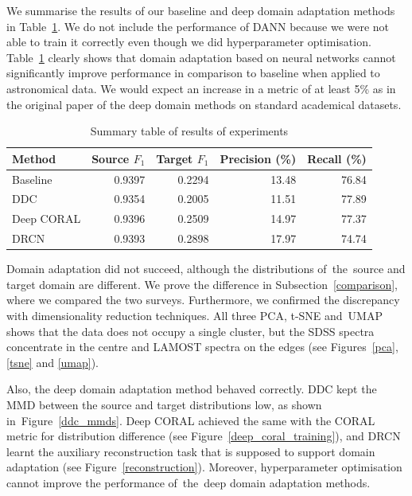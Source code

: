 We summarise the results of our baseline and deep domain adaptation methods in Table~\ref{summary}.
We do not include the performance of DANN
because we were not able to train it correctly even though we did hyperparameter optimisation.
Table~\ref{summary} clearly shows that domain adaptation based on neural networks cannot significantly improve performance in comparison to baseline
when applied to astronomical data.
We would expect an increase in a metric of at least 5\% as in the original paper of the deep domain methods on standard academical datasets.

\begin{table}
\begin{center}
\begin{tabular}{|l|r|r|r|r|}
	\hline
	Method & Source \(F_1\) & Target \(F_1\) & Precision (\%) & Recall (\%) \\
	\hline \hline
	Baseline & 0.9397 & 0.2294 & 13.48 & 76.84 \\ \hline
	DDC & 0.9354 & 0.2005 & 11.51 & 77.89 \\ \hline
	Deep CORAL & 0.9396 & 0.2509 & 14.97 & 77.37 \\ \hline
	DRCN & 0.9393 & 0.2898 & 17.97 & 74.74 \\ \hline
\end{tabular}
\end{center}
\caption{Summary table of results of experiments}
\label{summary}
\end{table}

Domain adaptation did not succeed,
although the distributions of~the~source and target domain are different.
We prove the difference in Subsection~\ref{comparison},
where we compared the two surveys.
Furthermore, we confirmed the discrepancy with dimensionality reduction techniques.
All three PCA, t-SNE and~UMAP shows that the data does not occupy a single cluster,
but the SDSS spectra concentrate in the centre and LAMOST spectra on the edges
(see Figures~\ref{pca}, \ref{tsne} and \ref{umap}).

Also, the deep domain adaptation method behaved correctly.
DDC kept the MMD between the source and target distributions low,
as shown in~Figure~\ref{ddc_mmds}.
Deep CORAL achieved the same with the CORAL metric for distribution difference
(see Figure~\ref{deep_coral_training}),
and DRCN learnt the auxiliary reconstruction task
that is supposed to support domain adaptation
(see Figure~\ref{reconstruction}).
Moreover, hyperparameter optimisation cannot improve the performance of~the~deep domain adaptation methods.

